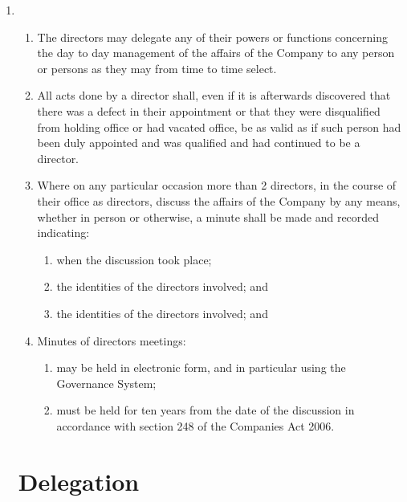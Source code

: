 \begin{enumerate}
\item
    \begin{enumerate}
    \item
        The directors may delegate any of their powers or functions concerning the day
        to day management of the affairs of the Company to any person or persons as they may
        from time to time select.
    \item
        All acts done by a director shall, even if it is afterwards discovered that there was
        a defect in their appointment or that they were disqualified from holding office or had
        vacated office, be as valid as if such person had been duly appointed and was qualified
        and had continued to be a director.
    \item
        Where on any particular occasion more than 2 directors, in the course of their
        office as directors, discuss the affairs of the Company by any means, whether in person
        or otherwise, a minute shall be made and recorded indicating:
            \begin{enumerate}
                \item
                    when the discussion took place;
                \item
                    the identities of the directors involved; and
                \item
                    the identities of the directors involved; and
            \end{enumerate}
    \item
        Minutes of directors meetings:
            \begin{enumerate}
                \item
                    may be held in electronic form, and in particular using the Governance System;
                \item
                    must be held for ten years from the date of the discussion in accordance with section
                    248 of the Companies Act 2006.
            \end{enumerate}
    \end{enumerate}

\section{Delegation}


\end{enumerate}
